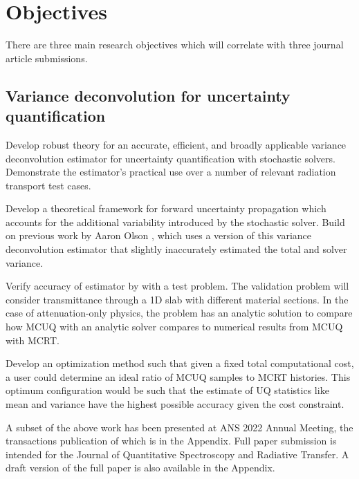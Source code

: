 \chapter{Objectives} \label{ch-objectives}
There are three main research objectives which will correlate with three journal article submissions. 

\section{Variance deconvolution for uncertainty quantification}
Develop robust theory for an accurate, efficient, and broadly applicable variance deconvolution estimator for uncertainty quantification with stochastic solvers. Demonstrate the estimator's practical use over a number of relevant radiation transport test cases.
\begin{todolist}
    \item[\done] Develop a theoretical framework for forward uncertainty propagation which accounts for the additional variability introduced by the stochastic solver. Build on previous work by Aaron Olson \cite{OlsonANS2019}, which uses a version of this variance deconvolution estimator that slightly inaccurately estimated the total and solver variance. 
    \item[\done] Verify accuracy of estimator by with a test problem. The validation problem will consider transmittance through a 1D slab with different material sections. In the case of attenuation-only physics, the problem has an analytic solution to compare how MCUQ with an analytic solver compares to numerical results from MCUQ with MCRT. 
    \item[\done] Develop an optimization method such that given a fixed total computational cost, a user could determine an ideal ratio of MCUQ samples to MCRT histories. This optimum configuration would be such that the estimate of UQ statistics like mean and variance have the highest possible accuracy given the cost constraint.
\end{todolist}
A subset of the above work has been presented at ANS 2022 Annual Meeting, the transactions publication of which is in the Appendix. Full paper submission is intended for the Journal of Quantitative Spectroscopy and Radiative Transfer. A draft version of the full paper is also available in the Appendix.


